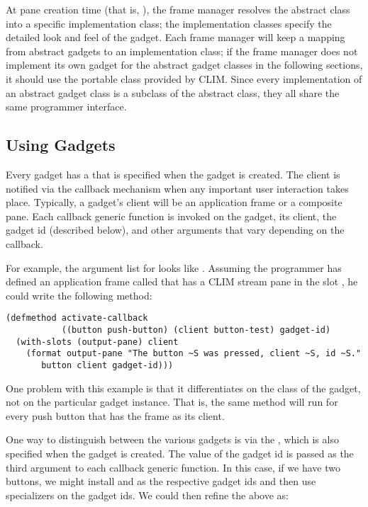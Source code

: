 At pane creation time (that is, ), the frame manager resolves the
abstract class into a specific implementation class; the implementation classes
specify the detailed look and feel of the gadget.  Each frame manager will keep
a mapping from abstract gadgets to an implementation class; if the frame manager
does not implement its own gadget for the abstract gadget classes in the
following sections, it should use the portable class provided by CLIM.  Since
every implementation of an abstract gadget class is a subclass of the abstract
class, they all share the same programmer interface.


\subsection {Using Gadgets}

Every gadget has a  that is specified when the gadget is
created.  The client is notified via the callback mechanism when any important
user interaction takes place.   Typically, a gadget's client will be an
application frame or a composite pane.  Each callback generic function is
invoked on the gadget, its client, the gadget id (described below), and other
arguments that vary depending on the callback.

For example, the argument list for  looks like
.  Assuming the programmer has defined an
application frame called  that has a CLIM stream pane in the
slot , he could write the following method:

\begin{verbatim}
(defmethod activate-callback
           ((button push-button) (client button-test) gadget-id)
  (with-slots (output-pane) client
    (format output-pane "The button ~S was pressed, client ~S, id ~S."
       button client gadget-id)))
\end{verbatim}

One problem with this example is that it differentiates on the class of the
gadget, not on the particular gadget instance.  That is, the same method will
run for every push button that has the  frame as its client.

One way to distinguish between the various gadgets is via the , which is also specified when the gadget is created.  The value of the
gadget id is passed as the third argument to each callback generic function.  In
this case, if we have two buttons, we might install  and  as
the respective gadget ids and then use  specializers on the gadget ids.
We could then refine the above as:

